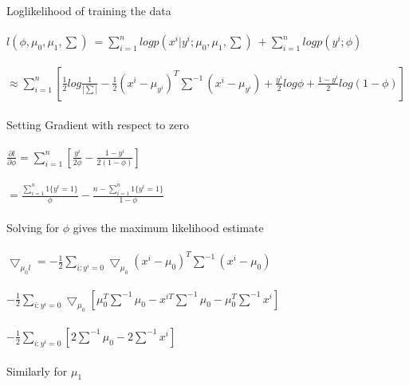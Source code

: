\newcommand\tab[1][1cm]{\hspace*{#1}}
\begin{answer}
\\ \\
Loglikelihood of training the data \\ \\
\tab[2.25cm]$l(\phi, \mu_0, \mu_1, \sum) \ =  \sum^n_{i=1}logp(x^i|y^i;\mu_0,\mu_1,\sum) \ +  \sum^n_{i=1}logp(y^i;\phi) $ \\ \\
\tab[3.25cm]$\approx \sum^n_{i=1} [\frac{1}{2}log\frac{1}{| \sum |} - \frac{1}{2}(x^i-\mu_{y^i})^T\sum^{-1}(x^i-\mu_{y^i}) +\frac{y^i}{2}log\phi + \frac{1 - y^i}{2}log(1-\phi) ]$ \\ \\
Setting Gradient with respect to zero \\ \\
\tab[2.25cm]$ \frac{\partial l}{\partial \phi} = \sum^n_{i=1}[\frac{y^i}{2\phi} - \frac{1-y^i}{2(1-\phi)}] $ \\ \\
\tab[3.25cm]$ = \frac{\sum^n_{i=1}1\{y^i=1\}}{\phi} -  \frac{n - \sum^n_{i=1}1\{y^i=1\}}{1-\phi} $ \\ \\
Solving for $\phi$ gives the maximum likelihood estimate \\ \\
\tab[3.25cm]$ \bigtriangledown_{\mu_0l} = -\frac{1}{2} \sum_{i:y^i=0} \bigtriangledown_{\mu_0} (x^i - \mu_0)^T \sum^{-1}(x^i-\mu_0)$ \\ \\
\tab[3.25cm]$ -\frac{1}{2} \sum_{i:y^i=0} \bigtriangledown_{\mu_0} [\mu^T_0 \sum^{-1} \mu_0 - x^{iT} \sum^{-1}\mu_0 - \mu^T_0\sum^{-1} x^i ]$ \\ \\
\tab[3.25cm]$ -\frac{1}{2} \sum_{i:y^i=0} [2\sum^{-1}\mu_0-2\sum^{-1}x^i] $ \\ \\
Similarly for $\mu_1$ \\ \\ 
\end{answer}
